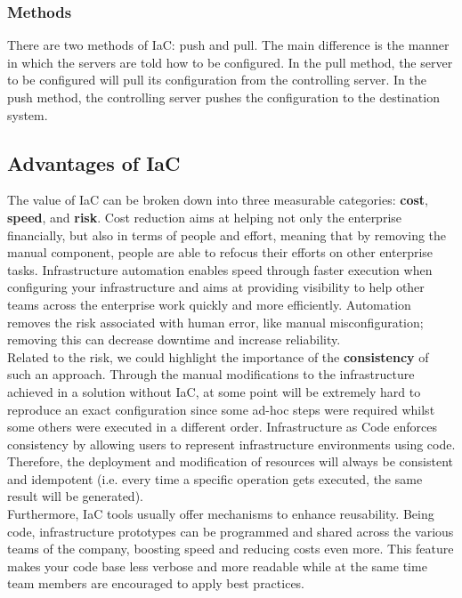 \subsubsection{Methods}

There are two methods of IaC: push and pull.
The main difference is the manner in which the servers are told how to be configured.
In the pull method, the server to be configured will pull its configuration from the controlling server.
In the push method, the controlling server pushes the configuration to the destination system.

\subsection{Advantages of IaC}

The value of IaC can be broken down into three measurable categories: \textbf{cost}, \textbf{speed}, and \textbf{risk}.
Cost reduction aims at helping not only the enterprise financially, but also in terms of people and effort, meaning that by removing the manual component, people are able to refocus their efforts on other enterprise tasks.
Infrastructure automation enables speed through faster execution when configuring your infrastructure and aims at providing visibility to help other teams across the enterprise work quickly and more efficiently.
Automation removes the risk associated with human error, like manual misconfiguration; removing this can decrease downtime and increase reliability.\\
Related to the risk, we could highlight the importance of the \textbf{consistency} of such an approach.
Through the manual modifications to the infrastructure achieved in a solution without IaC, at some point will be extremely hard to reproduce an exact configuration since some ad-hoc steps were required
whilst some others were executed in a different order.
Infrastructure as Code enforces consistency by allowing users to represent infrastructure environments using code.
Therefore, the deployment and modification of resources will always be consistent and idempotent (i.e. every time a specific operation gets executed, the same result will be generated).\\
Furthermore, IaC tools usually offer mechanisms to enhance reusability.
Being code, infrastructure prototypes can be programmed and shared across the various teams of the company, boosting speed and reducing costs even more.
This feature makes your code base less verbose and more readable while at the same time team members are encouraged to apply best practices.\\
